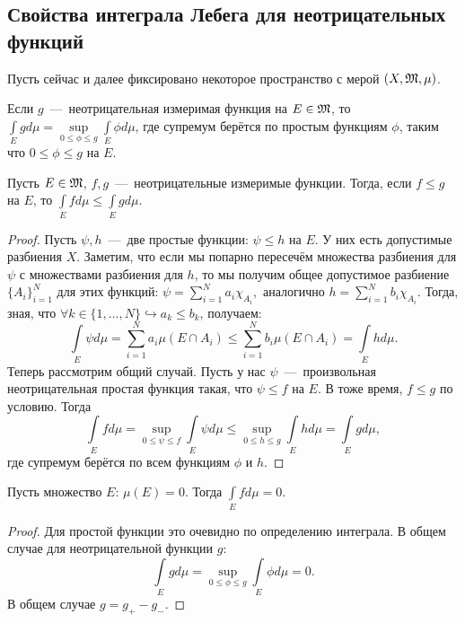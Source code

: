 \subsection{Свойства интеграла Лебега для неотрицательных функций}
\begin{reminder}
    Пусть сейчас и далее фиксировано некоторое пространство с мерой $(X, \mathfrak{M}, \mu)$.
\end{reminder}
\begin{reminder}
    Если $g$~---~неотрицательная измеримая функция на $E \in \mathfrak{M}$, то $\int\limits_E gd\mu = \sup\limits_{0 \leq \phi \leq g} \int\limits_E \phi d\mu$, где супремум берётся по простым функциям $\phi$, таким что $0 \leq \phi \leq g$ на $E$.
\end{reminder}

\begin{proposition}
    Пусть $E \in \mathfrak{M}$, $f, g$~---~неотрицательные измеримые функции. Тогда, если $f \leq g$ на $E$, то $\int\limits_E fd\mu \leq \int\limits_E gd\mu$.
\end{proposition}
\begin{proof}
    Пусть $\psi, h$~---~две простые функции: $\psi \leq h$ на $E$. У них есть допустимые разбиения $X$. Заметим, что если мы попарно пересечём множества разбиения для $\psi$ с множествами разбиения для $h$, то мы получим общее допустимое разбиение $\{A_i\}_{i = 1}^N$ для этих функций: $\psi = \sum\limits_{i = 1}^N a_i\chi_{A_i},\text{ аналогично } h = \sum\limits_{i = 1}^N b_i\chi_{A_i}$. Тогда, зная, что $\forall k \in \{1,\dots, N\} \hookrightarrow a_k \leq b_k$, получаем:\[\int\limits_{E} \psi d\mu = \sum\limits_{i = 1}^N a_i \mu(E \cap A_i) \leq \sum\limits_{i = 1}^N b_i \mu(E \cap A_i) = \int\limits_E h d \mu.\] Теперь рассмотрим общий случай. Пусть у нас $\psi$~---~произвольная неотрицательная простая функция такая, что $\psi \leq f$ на $E$. В тоже время, $f \leq g$ по условию. Тогда \[\int\limits_E fd\mu = \sup\limits_{0 \leq \psi \leq f}\int\limits_E \psi d\mu \leq \sup\limits_{0 \leq h \leq g} \int\limits_{E} h d\mu = \int\limits_{E}g d\mu,\] где супремум берётся по всем функциям $\phi$ и $h$.
\end{proof}
\begin{proposition}
    Пусть множество $E$: $\mu(E) = 0$. Тогда $\int\limits_E fd\mu = 0$.
\end{proposition}
\begin{proof}
    Для простой функции это очевидно по определению интеграла. В общем случае для неотрицательной функции $g$: \[\int\limits_E gd\mu = \sup\limits_{ 0 \leq \phi \leq g} \int\limits_E \phi d \mu = 0.\]
    В общем случае $g = g_+ - g_-$.
\end{proof}
